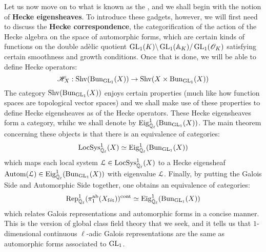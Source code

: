         Let us now move on to what is known as the , and we shall begin with the notion of \textbf{Hecke eigensheaves}. To introduce these gadgets, however, we will first need to discuss the \textbf{Hecke correspondence}, the categorification of the action of the Hecke algebra on the space of automorphic forms, which are certain kinds of functions on the double ad\`elic quotient $\operatorname{GL}_1(K) \backslash \operatorname{GL}_1(\mathbb{A}_K) / \operatorname{GL}_1(\mathscr{O}_K)$ satisfying certain smoothness and growth conditions. Once that is done, we will be able to define Hecke operators:
            $$\scrH_X: \Shv(\Bun_{\GL_1}(X)) \to \Shv(X \x \Bun_{\GL_1}(X))$$
        The category $\mathrm{Shv}(\mathrm{Bun}_{\operatorname{GL}_1}(X))$ enjoys certain  properties (much like how function spaces are topological vector spaces) and we shall make use of these properties to define Hecke eigensheaves as  of the Hecke operators. These Hecke eigensheaves form a category, whihc we shall denote by $\mathrm{Eig}^1_{\bar{\mathbb{Q}}_{\ell}}(\mathrm{Bun}_{\operatorname{GL}_1}(X))$. The main theorem concerning these objects is that there is an equivalence of categories:
            $$\mathrm{LocSys}_{\bar{\mathbb{Q}}_{\ell}}^1(X) \simeq \mathrm{Eig}^1_{\bar{\mathbb{Q}}_{\ell}}(\mathrm{Bun}_{\operatorname{GL}_1}(X))$$
        which maps each local system $\mathcal{L} \in \mathrm{LocSys}_{\bar{\mathbb{Q}}_{\ell}}^1(X)$ to a Hecke eigensheaf $\mathrm{Autom}(\mathcal{L}) \in \mathrm{Eig}^1_{\bar{\mathbb{Q}}_{\ell}}(\mathrm{Bun}_{\operatorname{GL}_1}(X))$ with eigenvalue $\mathcal{L}$. Finally, by putting the Galois Side and Automorphic Side together, one obtains an equivalence of categories:
            $$\mathrm{Rep}_{\bar{\mathbb{Q}}_{\ell}}^1(\pi_1^{\mathrm{ab}}(X_{\mathrm{f\acute{e}t}}))^{\mathrm{cont}} \simeq \mathrm{Eig}^1_{\bar{\mathbb{Q}}_{\ell}}(\mathrm{Bun}_{\operatorname{GL}_1}(X))$$
        which relates Galois representations and automorphic forms in a concise manner. This is the version of global class field theory that we seek, and it tells us that $1$-dimensional continuous $\ell$-adic Galois representations are the same as automorphic forms associated to $\operatorname{GL}_1$.
        
